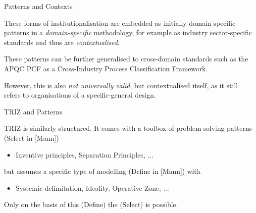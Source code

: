 \documentclass{beamer}
\begin{document}
\begin{frame}{Patterns and Contexts}

  These forms of institutionalisation are embedded as initially domain-specific
patterns in a \emph{domain-specific} methodology, for example as industry
sector-specific standards and thus are \emph{contextualised}.

These patterns can be further generalised to cross-domain standards such as
the APQC PCF as a Cross-Industry Process Classification Framework.

However, this is also \emph{not universally valid}, but contextualised itself,
as it still refers to organisations of a specific-general design.

\end{frame}

\begin{frame}{TRIZ and Patterns}

TRIZ is similarly structured. It comes with a toolbox of problem-solving
patterns (Select in [Mann])

\begin{itemize}
\item[] Inventive principles, Separation Principles, ...
\end{itemize}
but assumes a specific type of modelling (Define in [Mann]) with
\begin{itemize}
\item[] Systemic delimitation, Ideality, Operative Zone, ...
\end{itemize}
Only on the basis of this (Define) the (Select) is possible. 
\end{frame}

\end{document}

